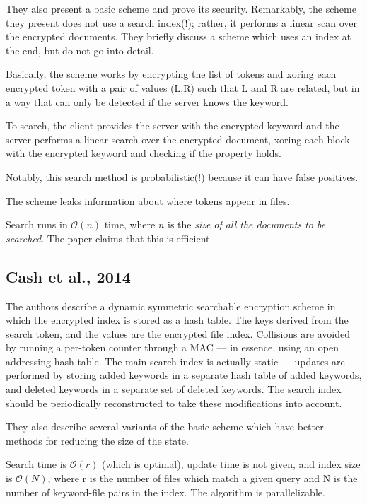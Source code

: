 They also present a basic scheme and prove its security. Remarkably, the scheme they present does not use a search index(!); rather, it performs a linear scan over the encrypted documents.
They briefly discuss a scheme which uses an index at the end, but do not go into detail.

Basically, the scheme works by encrypting the list of tokens and xoring each encrypted token with a pair of values (L,R) such that L and R are related, but in a way that can only be detected if the server knows the keyword.

To search, the client provides the server with the encrypted keyword and the server performs a linear search over the encrypted document, xoring each block with the encrypted keyword and checking if the property holds.

Notably, this search method is probabilistic(!) because it can have false positives.

The scheme leaks information about where tokens appear in files.

Search runs in $\mathcal{O}(n)$ time, where $n$ is the \textit{size of all the documents to be searched}. The paper claims that this is efficient.

\subsection{Cash et al., 2014}

\cite{cash14} 

The authors describe a dynamic symmetric searchable encryption scheme in which the encrypted index is stored as a hash table. The keys derived from the search token, and the values are the encrypted file index.
Collisions are avoided by running a per-token counter through a MAC
--- in essence, using an open addressing hash table.
The main search index is actually static --- updates are performed by storing added keywords in a separate hash table of added keywords, and deleted keywords in a separate set of deleted keywords. The search index should be periodically reconstructed to take these modifications into account.

They also describe several variants of the basic scheme which have better methods for reducing the size of the state.

Search time is $\mathcal{O}(r)$ (which is optimal), update time is not given, and index size is $\mathcal{O}(N)$, where r is the number of files which match a given query and N is the number of keyword-file pairs in the index.
The algorithm is parallelizable.

